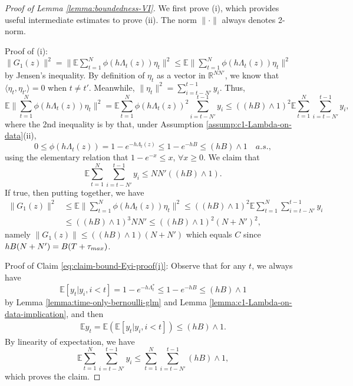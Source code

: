 \documentclass[10pt,a4paper]{amsart}
\newcommand{\E}{\mathbb{E}}
\newcommand{\R}{\mathbb{R}}
\begin{document}
\begin{proof}[Proof of Lemma \ref{lemma:boundedness-VI}]
We first prove (i), which provides useful intermediate estimates to prove (ii).
The norm $\| \cdot \|$ always denotes 2-norm.

\vspace{5pt}
Proof of (i): $\| G_1(z) \|^2 = \| \E \sum_{t=1}^N \phi( h \Lambda_t(z)) \eta_t \|^2 \le \E \| \sum_{t=1}^N \phi( h \Lambda_t(z)) \eta_t \|^2 $ by Jensen's inequality.
By definition of $\eta_t$ as a vector in $\R^{NN'}$, we know that 
$\langle \eta_t, \eta_{t'} \rangle =0$ when $t \neq t'$.
Meanwhile,
$\|\eta_t\|^2 = \sum_{i = t-N'}^{t-1} y_i$.
Thus,
\[
\E \| \sum_{t=1}^N \phi( h \Lambda_t(z)) \eta_t \|^2 
= \E \sum_{t=1}^N \phi( h \Lambda_t(z))^2  \sum_{i = t-N'}^{t-1} y_i
\le ( (hB) \wedge 1)^2 \E \sum_{t=1}^N  \sum_{i = t-N'}^{t-1} y_i, 
\]
where the 2nd inequality is by that, under  Assumption \ref{assump:c1-Lambda-on-data}(ii),
\[
0 \le \phi( h \Lambda_t(z)) = 1-e^{- h \Lambda_t(z)} 
\le  1- e^{-hB} \le  (hB) \wedge 1 \quad a.s.,
\]
using the elementary relation that $1-e^{-x} \le x$, $\forall x \ge 0$.
We claim that 
\begin{equation}\label{eq:claim-bound-Eyi-proof(i)}
\E \sum_{t=1}^N  \sum_{i = t-N'}^{t-1} y_i
\le N N'   ( (hB) \wedge 1).
\end{equation}
If true, then putting together, we have
\begin{align*}
\| G_1(z) \|^2
& \le  \E \| \sum_{t=1}^N \phi( h \Lambda_t(z)) \eta_t \|^2
\le ( (hB) \wedge 1)^2 \E \sum_{t=1}^N  \sum_{i = t-N'}^{t-1} y_i \\
& \le  ( (hB) \wedge 1)^3 N N'
\le ( (hB) \wedge 1)^2 (N+N')^2,
\end{align*}
namely $\| G_1(z) \| \le  ( (hB) \wedge 1) (N + N')$ which equals $C$ since 
$ hB(N + N')  = B (T+ \tau_{\rm max})$.

\vspace{5pt}
Proof of Claim \eqref{eq:claim-bound-Eyi-proof(i)}:
Observe that for any $t$, we always have
\begin{equation}\label{eq:Eyt-upperbound-as-proof1}
\E [ y_t | y_i, i <t ] = 1-e^{ - h \Lambda_t^*}
\le   1- e^{- hB}  \le (hB) \wedge 1
\end{equation} 
 by Lemma \ref{lemma:time-only-bernoulli-glm} and Lemma \ref{lemma:c1-Lambda-on-data-implication},
 and then
\begin{align*}
\E y_t 
 = \E \left(  \E[ y_t | y_{i}, i < t]  \right)
 \le  (hB) \wedge 1.
\end{align*}
By linearity of expectation, we have 
\[
\E \sum_{t=1}^N  \sum_{i = t-N'}^{t-1} y_i
\le \sum_{t=1}^N  \sum_{i = t-N'}^{t-1}    (hB) \wedge 1,
\]
which proves the claim.


\end{proof}
\end{document}
